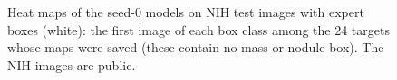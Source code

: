\begin{table}[htbp]
\centering\small
\caption{Pointing game on the 984 NIH expert boxes (164 focal: Mass, Nodule): hit rate averaged over the five seeds, with a 95\,\%
image-cluster bootstrap interval (descriptive).}
\label{tab:xm_pointing}
\end{table}

\begin{figure}[htbp]
\centering
{}
\caption{Heat maps of the seed-0 models on NIH test images with expert boxes (white): the first image of each box class among the 24
targets whose maps were saved (these contain no mass or nodule box). The NIH images are public.}
\label{fig:xm_xai}
\end{figure}
